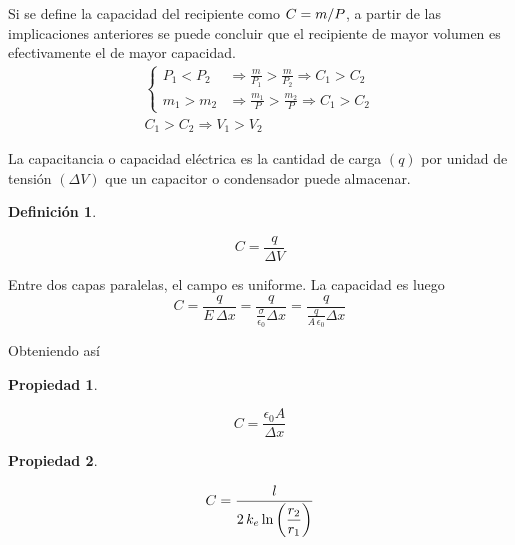 \documentclass[a5paper,12pt,twoside]{book}
\newtheorem{defn}{{Definición}}[chapter]
\newtheorem{prop}{{Propiedad}}[chapter]
\begin{document}
Si se define la capacidad del recipiente como $C= m/P$, a partir de las implicaciones anteriores se puede concluir que el recipiente de mayor volumen es efectivamente el de mayor capacidad.
\begin{gather*}
    \left\{
    \begin{aligned}
        P_1 < P_2 & \Rightarrow \frac{m}{P_1} > \frac{m}{P_2} \Rightarrow C_1 > C_2
        \\[1ex]
        m_1 > m_2 & \Rightarrow \frac{m_1}{P} > \frac{m_2}{P} \Rightarrow C_1 > C_2
    \end{aligned}
    \right.
    \\[1em]
    C_1 > C_2 \Rightarrow V_1 > V_2
\end{gather*}

La capacitancia o capacidad eléctrica es la cantidad de carga $(q)$ por unidad de tensión $(\Delta V)$ que un capacitor o condensador puede almacenar.

\begin{mdframed}[style=MyFrame1]
    \begin{defn}
    \end{defn}
    \begin{equation*}
        C = \frac{q}{\Delta V}
    \end{equation*}
\end{mdframed}

Entre dos capas paralelas, el campo es uniforme. La capacidad es luego
\begin{equation*}
    C = \frac{q}{E \, \Delta x} = \frac{q}{\frac{\sigma}{\epsilon_0}\Delta x} = \frac{q}{\tfrac{q}{A \, \epsilon_0}\Delta x}
\end{equation*}

Obteniendo así

\begin{mdframed}[style=MyFrame1]
    \begin{prop}
    \end{prop}
    \begin{equation*}
        C = \frac{\epsilon_0 A}{\Delta x}
    \end{equation*}
\end{mdframed}

\begin{mdframed}[style=MyFrame1]
    \begin{prop}
    \end{prop}
    \begin{equation*}
        C = \frac{l}{2 \, k_e \ln{\left(\dfrac{r_2}{r_1}\right)}}
    \end{equation*}
\end{mdframed}
\end{document}
